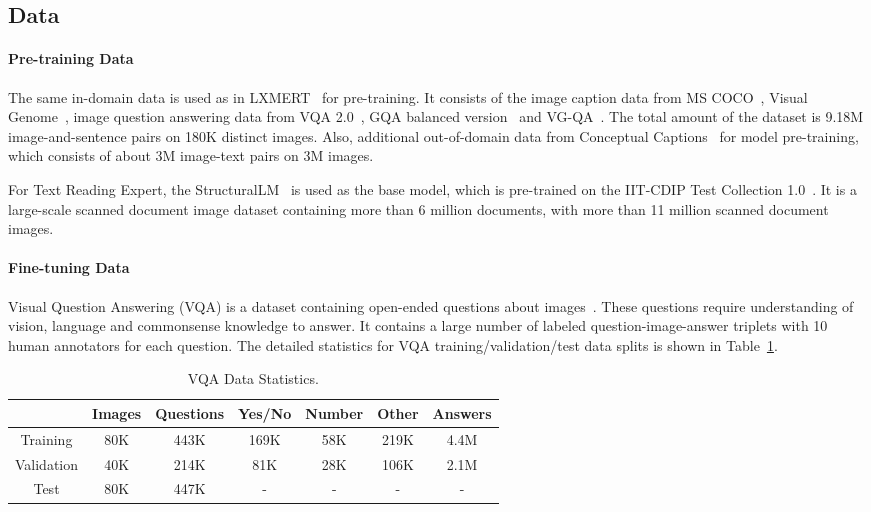 \subsection{Data}

\paragraph{Pre-training Data}
The same in-domain data is used as in LXMERT~\citep{tan2019lxmert} for pre-training. It consists of the image caption data from MS COCO~\citep{lin2014microsoft}, Visual Genome~\citep{krishna2017visual}, image question answering data from VQA 2.0~\citep{antol2015vqa}, GQA balanced version~\citep{hudson2019gqa} and VG-QA~\citep{zhu2016visual7w}. The total amount of the dataset is 9.18M image-and-sentence pairs on 180K distinct images. Also, additional out-of-domain data from Conceptual Captions~\citep{sharma2018conceptual} for model pre-training, which consists of about 3M image-text pairs on 3M images.

For Text Reading Expert, the StructuralLM~\citep{structurallm} is used as the base model, which is pre-trained on the IIT-CDIP Test Collection 1.0~\citep{Lewis}. It is a large-scale scanned document image dataset containing more than 6 million documents, with more than 11 million scanned document images.

\paragraph{Fine-tuning Data}
Visual Question Answering (VQA) is a dataset containing open-ended questions about images~\citep{antol2015vqa}. These questions require understanding of vision, language and commonsense knowledge to answer. It contains a large number of labeled question-image-answer triplets with 10 human annotators for each question. The detailed statistics for VQA training/validation/test data splits is shown in Table~\ref{tab:vqa_stat}. 

\begin{table}[t]
\caption{VQA Data Statistics.}
\centering
\begin{tabular}{c|c|cccc|c}
\toprule
 & Images & Questions & Yes/No & Number & Other & Answers  \\
\midrule
Training                                                    & 80K & 443K & 169K & 58K & 219K & 4.4M  \\
Validation                                                 & 40K & 214K & 81K & 28K & 106K & 2.1M  \\
Test & 80K    & 447K & - & - & - & - \\
\bottomrule
\end{tabular}
\label{tab:vqa_stat}
\end{table}

